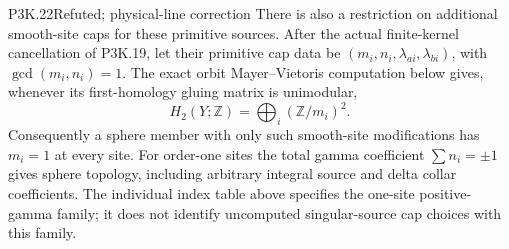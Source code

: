 \begin{statement}{P3K.22}{Refuted; physical-line correction}
There is also a restriction on additional smooth-site caps for these
primitive sources.  After the actual finite-kernel cancellation of
P3K.19, let their primitive cap data be
\((m_i,n_i,\lambda_{ai},\lambda_{bi})\), with
\(\gcd(m_i,n_i)=1\).  The exact orbit Mayer--Vietoris computation
below gives, whenever its first-homology gluing matrix is unimodular,
\[
        H_2(Y;\mathbb Z)=\bigoplus_i(\mathbb Z/m_i)^2.       \tag{P3K.22.1}
\]
Consequently a sphere member with only such smooth-site modifications
has \(m_i=1\) at every site.  For order-one sites the total gamma
coefficient \(\sum n_i=\pm1\) gives sphere topology, including
arbitrary integral source and delta collar coefficients.  The
individual index table above specifies the one-site positive-gamma
family; it does not identify uncomputed singular-source cap choices
with this family.
\end{statement}

